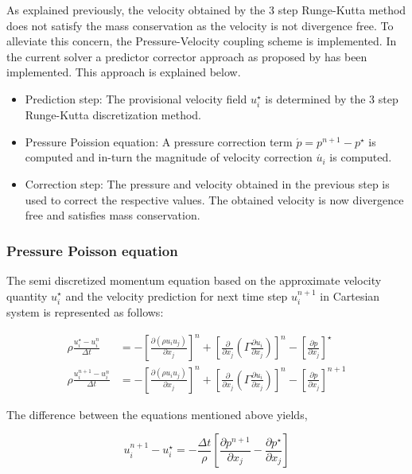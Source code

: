 As explained previously, the velocity obtained by the 3 step Runge-Kutta method does not satisfy the mass conservation as the velocity is not divergence free. To alleviate this concern, the Pressure-Velocity coupling scheme is implemented. In the current solver a predictor corrector approach as proposed by \citet{munsch2015entwicklung} has been implemented. This approach is explained below.
\begin{itemize}
\item Prediction step: The provisional velocity field $u_i^{\star}$ is determined by the 3 step Runge-Kutta discretization method.
\item Pressure Poission equation: A pressure correction term $\acute{p} = p^{n+1} - p^{\star}$ is computed and in-turn the magnitude of velocity correction $\acute{u_i}$ is computed.
\item Correction step: The pressure and velocity obtained in the previous step is used to correct the respective values. The obtained velocity is now divergence free and satisfies mass conservation.
\end{itemize}

\subsubsection{Pressure Poisson equation}
The semi discretized momentum equation based on the approximate velocity quantity $u_i^{\star}$ and the velocity prediction for next time step $u_i^{n+1}$ in Cartesian system is represented as follows:

\begin{align}
\rho \frac{u_i^{\star} - u_i^n}{\Delta t} &= - \left[ \frac{\partial \left(\rho u_i u_j \right)}{\partial x_j} \right]^n + \left[ \frac{\partial}{\partial x_j} \left(\Gamma \frac{\partial u_i}{\partial x_j} \right) \right]^n - \left[\frac{\partial p}{\partial x_j} \right]^{\star}\\
\rho \frac{u_i^{n+1} - u_i^n}{\Delta t} &= - \left[ \frac{\partial \left(\rho u_i u_j \right)}{\partial x_j} \right]^n + \left[ \frac{\partial}{\partial x_j} \left(\Gamma \frac{\partial u_i}{\partial x_j} \right) \right]^n - \left[\frac{\partial p}{\partial x_j} \right]^{n+1}
\label{eqn:3.74}
\end{align}

The difference between the equations mentioned above yields,

\begin{equation}
u_i^{n+1} - u_i^{\star} = - \frac{\Delta t}{\rho} \left[ \frac{\partial p^{n+1}}{\partial x_j} - \frac{\partial p^{\star}}{\partial x_j} \right]
\label{eqn:3.75}
\end{equation}

